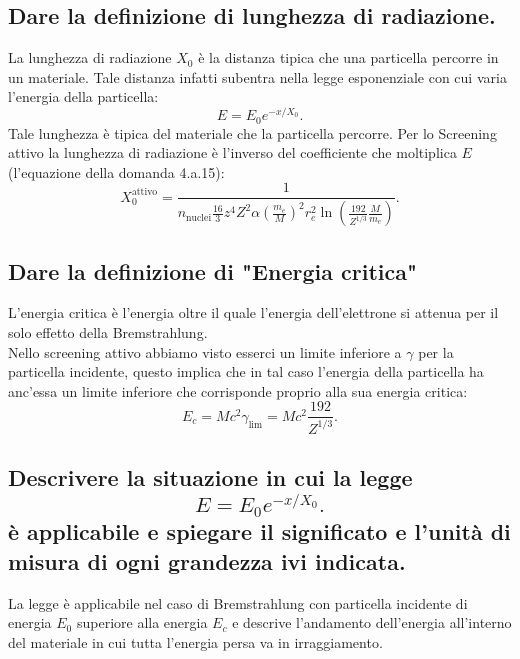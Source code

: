 \subsection[]{Dare la definizione di lunghezza di radiazione.
}\label{sec:4.a.17}
La lunghezza di radiazione $X_0$ è la distanza tipica che una particella percorre in un materiale. Tale distanza infatti subentra nella legge esponenziale con cui varia l'energia della particella:
\[
	E = E_0 e^{-x /X_0}
.\] 
Tale lunghezza è tipica del materiale che la particella percorre. Per lo Screening attivo la lunghezza di radiazione è l'inverso del coefficiente che moltiplica $E$ (l'equazione della domanda 4.a.15):
\[
	X_0^{\text{attivo}} = \frac{1}{n_{\text{nuclei}}\frac{16}{3}z^4Z^2\alpha\left(\frac{m_e}{M}\right)^2r_e^2\ln\left(\frac{192}{Z^{1 /3}}\frac{M}{m_e}\right)} 
.\] 

\subsection[]{Dare la definizione di "Energia critica"
}\label{sec:4.a.18}
L'energia critica è l'energia oltre il quale l'energia dell'elettrone si attenua per il solo effetto della Bremstrahlung.\\
Nello screening attivo abbiamo visto esserci un limite inferiore a $\gamma$ per la particella incidente, questo implica che in tal caso l'energia della particella ha anc'essa un limite inferiore che corrisponde proprio alla sua energia critica:
\[
	E_{c} = Mc^2\gamma_{\text{lim}}= Mc^2 \frac{192}{Z^{1 /3}}
.\] 
\subsection[]{Descrivere la situazione in cui la legge \[
	E = E_0 e^{-x /X_0}
.\] 
è applicabile e spiegare il significato e l'unità di misura di ogni grandezza ivi indicata.
}\label{sec:4.a.19}
La legge è applicabile nel caso di Bremstrahlung con particella incidente di energia $E_0$ superiore alla energia $E_{c}$ e descrive l'andamento dell'energia all'interno del materiale in cui tutta l'energia persa va in irraggiamento.
